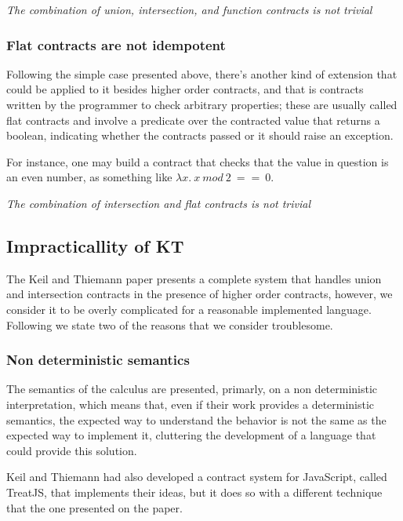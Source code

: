 \textit{The combination of union, intersection, and function contracts is not trivial}

\subsubsection*{Flat contracts are not idempotent}

Following the simple case presented above, there's another kind of extension that could be
applied to it besides higher order contracts, and that is contracts written by the
programmer to check arbitrary properties; these are usually called flat contracts and
involve a predicate over the contracted value that returns a boolean, indicating whether
the contracts passed or it should raise an exception.

For instance, one may build a contract that checks that the value in question is an
even number, as something like $\lambda x.~x~mod~2~==~0$.


\textit{The combination of intersection and flat contracts is not trivial}


\subsection{Impracticallity of KT}

The Keil and Thiemann paper presents a complete system that handles union and intersection
contracts in the presence of higher order contracts, however, we consider it to be overly
complicated for a reasonable implemented language.
Following we state two of the reasons that we consider troublesome.

\subsubsection{Non deterministic semantics}

The semantics of the calculus are presented, primarly, on a non deterministic interpretation,
which means that, even if their work provides a deterministic semantics,
the expected way to understand
the behavior is not the same as the expected way to implement it, cluttering the development
of a language that could provide this solution.

Keil and Thiemann had also developed a contract system for JavaScript, called TreatJS, that
implements their ideas, but it does so with a different technique that the one presented
on the paper.

